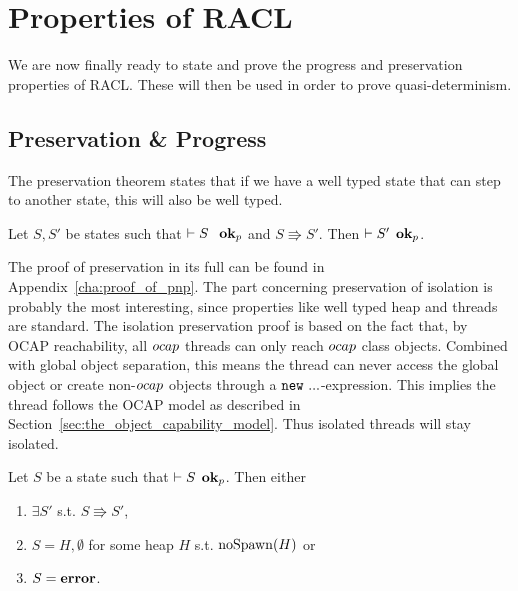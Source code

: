 \chapter{Properties of RACL}
\label{cha:properties_of_racl}


We are now finally ready to state and prove the progress and preservation
properties of RACL. These will then be used in order to prove
quasi-determinism. 


\section{Preservation \& Progress}%
\label{sec:preservation_and_progress}

The preservation theorem states that if we have a well typed state that can
step to another state, this will also be well typed.

\begin{theorem}[Preservation]
  \label{thm:preservation}
  Let $S, S'$ be states such that $\vdash S \:\:~\mbox{{\bf ok}$_p$}$ and $S \Rrightarrow
  S'$. Then $\vdash S' \:\: \mbox{{\bf ok}$_p$}$.
\end{theorem}

The proof of preservation in its full can be found in
Appendix~\ref{cha:proof_of_pnp}. The part concerning preservation of isolation
is probably the most interesting, since properties like well typed heap and
threads are standard. The isolation preservation proof is based on the
fact that, by OCAP reachability, all $\mbox{$ocap$}$ threads can only reach $\mbox{$ocap$}$
class objects. Combined with global object separation, this means the thread can
never access the global object or create non-$\mbox{$ocap$}$ objects through a
$\mbox{\mdseries\texttt{new}~$...$}$-expression. This implies the thread follows the OCAP model as
described in Section~\ref{sec:the_object_capability_model}. Thus isolated
threads will stay isolated.

\begin{theorem}[Progress]
  \label{thm:progress}
  Let $S$ be a state such that $\vdash S \:\: \mbox{{\bf ok}$_p$}$. Then either 
  \begin{enumerate}
    \item $\exists S'$ s.t. $S \Rrightarrow S'$, 
    \item $S = H, \emptyset$ for some heap $H$ s.t. $\mbox{$\mathrm{noSpawn}$}{(H)}$ or
    \item $S = \mbox{{\bf error}}$.
  \end{enumerate}
\end{theorem}

